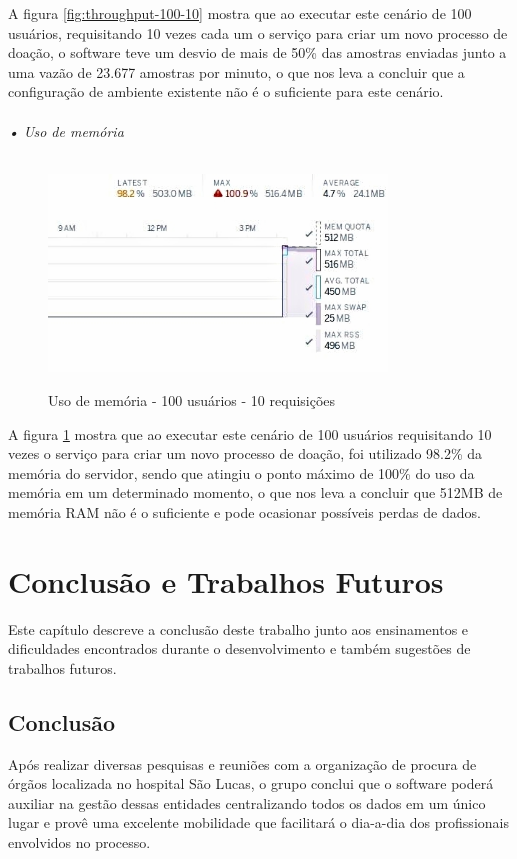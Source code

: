 \documentclass[portuguese,oneside]{tcc}
\begin{document}
A figura \ref{fig:throughput-100-10} mostra que ao executar este cenário de 100 usuários, requisitando 10 vezes cada um o serviço para criar um novo processo de doação, o software teve um desvio de mais de 50\% das amostras enviadas junto a uma vazão de 23.677 amostras por minuto, o que nos leva a concluir que a configuração de ambiente existente não é o suficiente para este cenário.

\newpage

\subparagraph{• Uso de memória}
\begin{figure}[htp]
\centering
\caption{Uso de memória - 100 usuários - 10 requisições}
\includegraphics[width=9cm]{100-10-memory}
\label{fig:uso-de-memoria-100-10}
\end{figure}
A figura \ref{fig:uso-de-memoria-100-10} mostra que ao executar este cenário de 100 usuários requisitando 10 vezes o serviço para criar um novo processo de doação, foi utilizado 98.2\% da memória do servidor, sendo que atingiu o ponto máximo de 100\% do uso da memória em um determinado momento, o que nos leva a concluir que 512MB de memória RAM não é o suficiente e pode ocasionar possíveis perdas de dados.

\chapter{Conclusão e Trabalhos Futuros}
Este capítulo descreve a conclusão deste trabalho junto aos ensinamentos e dificuldades encontrados durante o desenvolvimento e também sugestões de trabalhos futuros.

\section{Conclusão}
Após realizar diversas pesquisas e reuniões com a organização de procura de órgãos localizada no hospital São Lucas, o grupo conclui que o software poderá auxiliar na gestão dessas entidades centralizando todos os dados em um  único lugar e provê uma excelente mobilidade que facilitará o dia-a-dia dos profissionais envolvidos no processo.
\end{document}

